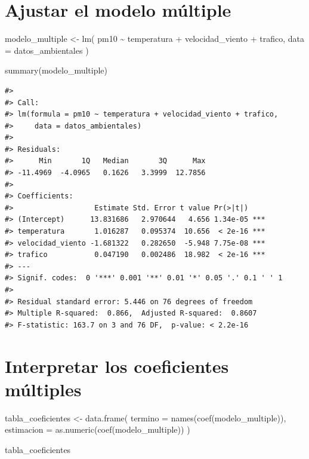 \documentclass[
  spanish,
  10.5pt,
  letterpaper,
  openany,
  headings=big]{scrbook}
\newenvironment{Shaded}{}{}
\newcommand{\AttributeTok}[1]{\textcolor[rgb]{0.84,0.23,0.29}{#1}}
\newcommand{\FunctionTok}[1]{\textcolor[rgb]{0.44,0.26,0.76}{#1}}
\newcommand{\NormalTok}[1]{\textcolor[rgb]{0.14,0.16,0.18}{#1}}
\newcommand{\OtherTok}[1]{\textcolor[rgb]{0.44,0.26,0.76}{#1}}
\newcommand{\SpecialCharTok}[1]{\textcolor[rgb]{0.00,0.36,0.77}{#1}}
\begin{document}
\section{Ajustar el modelo
múltiple}\label{ajustar-el-modelo-muxfaltiple}

\begin{Shaded}
\begin{Highlighting}[]
\NormalTok{modelo\_multiple }\OtherTok{\textless{}{-}} \FunctionTok{lm}\NormalTok{(}
\NormalTok{  pm10 }\SpecialCharTok{\textasciitilde{}}\NormalTok{ temperatura }\SpecialCharTok{+}\NormalTok{ velocidad\_viento }\SpecialCharTok{+}\NormalTok{ trafico,}
  \AttributeTok{data =}\NormalTok{ datos\_ambientales}
\NormalTok{)}

\FunctionTok{summary}\NormalTok{(modelo\_multiple)}
\end{Highlighting}
\end{Shaded}

\begin{verbatim}
#> 
#> Call:
#> lm(formula = pm10 ~ temperatura + velocidad_viento + trafico, 
#>     data = datos_ambientales)
#> 
#> Residuals:
#>      Min       1Q   Median       3Q      Max 
#> -11.4969  -4.0965   0.1626   3.3999  12.7856 
#> 
#> Coefficients:
#>                   Estimate Std. Error t value Pr(>|t|)    
#> (Intercept)      13.831686   2.970644   4.656 1.34e-05 ***
#> temperatura       1.016287   0.095374  10.656  < 2e-16 ***
#> velocidad_viento -1.681322   0.282650  -5.948 7.75e-08 ***
#> trafico           0.047190   0.002486  18.982  < 2e-16 ***
#> ---
#> Signif. codes:  0 '***' 0.001 '**' 0.01 '*' 0.05 '.' 0.1 ' ' 1
#> 
#> Residual standard error: 5.446 on 76 degrees of freedom
#> Multiple R-squared:  0.866,  Adjusted R-squared:  0.8607 
#> F-statistic: 163.7 on 3 and 76 DF,  p-value: < 2.2e-16
\end{verbatim}

\section{Interpretar los coeficientes
múltiples}\label{interpretar-los-coeficientes-muxfaltiples}

\begin{Shaded}
\begin{Highlighting}[]
\NormalTok{tabla\_coeficientes }\OtherTok{\textless{}{-}} \FunctionTok{data.frame}\NormalTok{(}
  \AttributeTok{termino =} \FunctionTok{names}\NormalTok{(}\FunctionTok{coef}\NormalTok{(modelo\_multiple)),}
  \AttributeTok{estimacion =} \FunctionTok{as.numeric}\NormalTok{(}\FunctionTok{coef}\NormalTok{(modelo\_multiple))}
\NormalTok{)}

\NormalTok{tabla\_coeficientes}
\end{Highlighting}
\end{Shaded}
\end{document}
